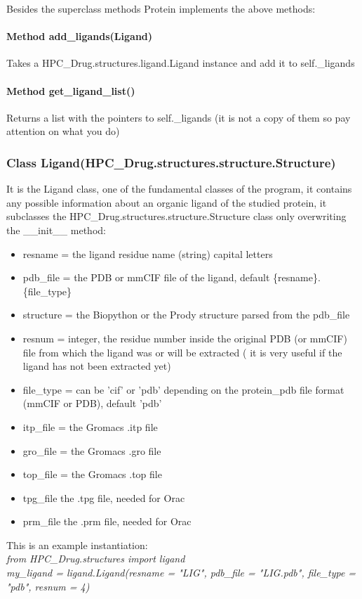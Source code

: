 		Besides the superclass methods Protein implements the above methods:
		
		\paragraph{Method add\_ligands(Ligand)}
		
			Takes a HPC\_Drug.structures.ligand.Ligand instance and add it to self.\_ligands
			
		\paragraph{Method get\_ligand\_list()}
		
			Returns a list with the pointers to self.\_ligands (it is not a copy of them so pay attention on what you do)

	\subsubsection{Class Ligand(HPC\_Drug.structures.structure.Structure)}
	
	It is the Ligand class, one of the fundamental classes of the program, it contains any possible information about an organic ligand of the studied protein, it subclasses the HPC\_Drug.structures.structure.Structure class only overwriting the \_\_init\_\_ method:
	\begin{itemize}
		\item resname = the ligand residue name (string) capital letters
		\item pdb\_file = the PDB or mmCIF file of the ligand, default \{resname\}.\{file\_type\}
		\item structure = the Biopython\cite{biopython} or the Prody\cite{prody} structure parsed from the pdb\_file
		\item resnum = integer, the residue number inside the original PDB (or mmCIF) file from which the ligand was or will be extracted ( it is very useful if the ligand has not been extracted yet)
		\item file\_type = can be 'cif' or 'pdb' depending on the protein\_pdb file format (mmCIF or PDB), default 'pdb'
		\item itp\_file = the Gromacs\cite{gromacs_ABRAHAM201519} .itp file
		\item gro\_file = the Gromacs\cite{gromacs_ABRAHAM201519} .gro file
		\item top\_file = the Gromacs\cite{gromacs_ABRAHAM201519} .top file
		\item tpg\_file the .tpg file, needed for Orac\cite{orac}
		\item prm\_file the .prm file, needed for Orac\cite{orac}
	\end{itemize}
	
	This is an example instantiation:\\
	\textit{from HPC\_Drug.structures import ligand\\
		$\ $\\
		my\_ligand = ligand.Ligand(resname = "LIG", pdb\_file = "LIG.pdb", file\_type = "pdb", resnum = 4)}
	
	
    